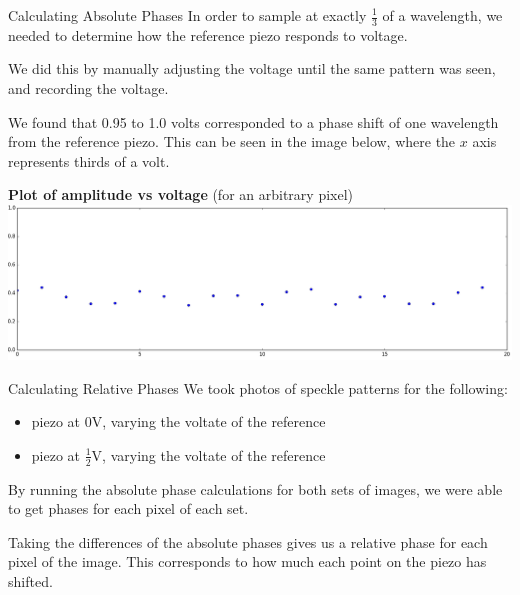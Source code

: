 \documentclass[pdf]{beamer}
\begin{document}
\begin{frame}{Calculating Absolute Phases}
In order to sample at exactly $\frac13$ of a wavelength, we needed to determine how the reference piezo responds to voltage.

We did this by manually adjusting the voltage until the same pattern was seen, and recording the voltage.

\vspace{.3cm}
We found that 0.95 to 1.0 volts corresponded to a phase shift of one wavelength from the reference piezo. This can be seen in the image below, where the $x$ axis represents thirds of a volt.

\begin{center}
{\bf Plot of amplitude vs voltage}
(for an arbitrary pixel)
\includegraphics[width=\textwidth]{cosine_check.png}
\end{center}


\end{frame}

\begin{frame}{Calculating Relative Phases}
We took photos of speckle patterns for the following:
\begin{itemize}
	\item piezo at 0V, varying the voltate of the reference
	\item piezo at $\frac12$V, varying the voltate of the reference
\end{itemize}
By running the absolute phase calculations for both sets of images, we were able to get phases for each pixel of each set.

\vspace{0.3cm}
Taking the differences of the absolute phases gives us a relative phase for each pixel of the image. This corresponds to how much each point on the piezo has shifted.
\end{frame}
\end{document}
